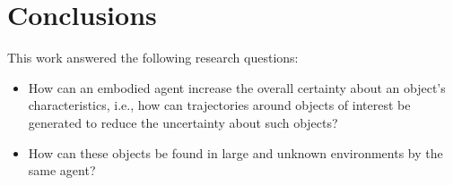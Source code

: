 \section{Conclusions}\label{sec:conclusions}
    This work answered the following research questions:
    \begin{itemize}
      \item How can an embodied agent increase the overall certainty about an object's characteristics, i.e., how can trajectories around objects of interest be generated to reduce the uncertainty about such objects? 
      \item How can these objects be found in large and unknown environments by the same agent?
    \end{itemize}
   




